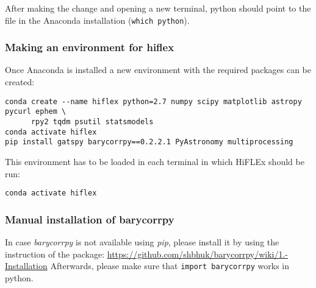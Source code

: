 \documentclass[10pt,a4paper]{article}
\begin{document}
After making the change and opening a new terminal, python should point to the file in the Anaconda installation (\verb|which python|).

\subsubsection{Making an environment for hiflex}
\label{Sec:Creating_conda_environment}
\noindent Once Anaconda is installed a new environment with the required packages can be created:

\begin{lstlisting}[style=base]
conda create --name hiflex python=2.7 numpy scipy matplotlib astropy pycurl ephem \
      rpy2 tqdm psutil statsmodels 
conda activate hiflex
pip install gatspy barycorrpy==0.2.2.1 PyAstronomy multiprocessing
\end{lstlisting}

This environment has to be loaded in each terminal in which HiFLEx should be run:
\begin{lstlisting}[style=base]
conda activate hiflex
\end{lstlisting}



\subsubsection{Manual installation of barycorrpy }
In case \textit{barycorrpy} is not available using \textit{pip}, please install it by using the instruction of the package: \url{https://github.com/shbhuk/barycorrpy/wiki/1.-Installation}
Afterwards, please make sure that \verb|import barycorrpy| works in python.
\end{document}
